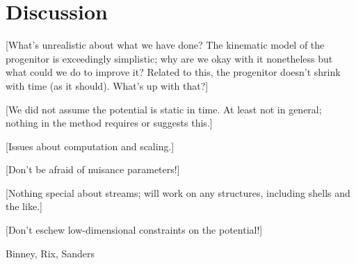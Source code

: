 \documentclass[letterpaper,12pt,preprint]{aastex}
\begin{document}
\section{Discussion}

[What's unrealistic about what we have done?  The kinematic model of
  the progenitor is exceedingly simplistic; why are we okay with it
  nonetheless but what could we do to improve it?  Related to this,
  the progenitor doesn't shrink with time (as it should).  What's up
  with that?]

[We did not assume the potential is static in time.  At least not in
  general; nothing in the method requires or suggests this.]

[Issues about computation and scaling.]

[Don't be afraid of nuisance parameters!]

[Nothing special about streams; will work on any structures, including
  shells and the like.]

[Don't eschew low-dimensional constraints on the potential!]




\acknowledgements
Binney, Rix, Sanders
\end{document}
